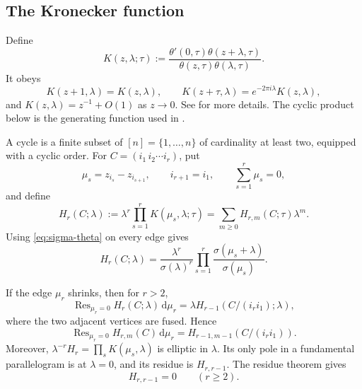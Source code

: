 \documentclass[11pt,a4paper]{amsart}
\numberwithin{equation}{section}
\theoremstyle{definition}
\theoremstyle{remark}
\DeclareMathOperator*{\Res}{Res}
\newcommand{\ii}{i}
\newcommand{\e}{e}
\newcommand{\dd}{\mathrm d}
\begin{document}
\subsection{The Kronecker function}

Define
\begin{equation}
 K(z,\lambda;\tau)
 :=\frac{\theta'(0,\tau)\theta(z+\lambda,\tau)}
 {\theta(z,\tau)\theta(\lambda,\tau)}.
 \label{eq:Kronecker}
\end{equation}
It obeys
\begin{equation}
 K(z+1,\lambda)=K(z,\lambda),\qquad
 K(z+\tau,\lambda)=\e^{-2\pi\ii\lambda}K(z,\lambda),
 \label{eq:Kronecker-periods}
\end{equation}
and $K(z,\lambda)=z^{-1}+O(1)$ as $z\to0$.  See \cite{Fay} for more details. The cyclic product below is the generating function used in \cite{DolanGoddard}.

A cycle is a finite subset of $[n]=\{1,\ldots,n\}$ of cardinality at least two, equipped with a cyclic order.  For
$C=(i_1\,i_2\cdots i_r)$, put
\begin{equation*}
 \mu_s=z_{i_s}-z_{i_{s+1}},\qquad i_{r+1}=i_1,
 \qquad \sum_{s=1}^r\mu_s=0,
\end{equation*}
and define
\begin{equation}
 H_r(C;\lambda):=\lambda^r\prod_{s=1}^rK(\mu_s,\lambda;\tau)
 =\sum_{m\geq0}H_{r,m}(C;\tau)\lambda^m.
 \label{eq:H-definition}
\end{equation}
Using \eqref{eq:sigma-theta} on every edge gives
\begin{equation}
 H_r(C;\lambda)=\frac{\lambda^r}{\sigma(\lambda)^r}
 \prod_{s=1}^r\frac{\sigma(\mu_s+\lambda)}{\sigma(\mu_s)}.
 \label{eq:H-sigma}
\end{equation}

If the edge $\mu_r$ shrinks, then for $r>2$,
\begin{equation}
 \Res_{\mu_r=0}H_r(C;\lambda)\,\dd\mu_r
 =\lambda H_{r-1}(C/(i_ri_1);\lambda),
 \label{eq:H-collision}
\end{equation}
where the two adjacent vertices are fused.  Hence
\begin{equation}
 \Res_{\mu_r=0}H_{r,m}(C)\,\dd\mu_r=H_{r-1,m-1}(C/(i_ri_1)).
 \label{eq:H-coefficient-collision}
\end{equation}
Moreover, $\lambda^{-r}H_r=\prod_sK(\mu_s,\lambda)$ is elliptic in
$\lambda$.  Its only pole in a fundamental parallelogram is at
$\lambda=0$, and its residue is $H_{r,r-1}$.  The residue theorem gives
\begin{equation}
 H_{r,r-1}=0\qquad(r\geq2).
 \label{eq:H-vanishing}
\end{equation}
\end{document}
